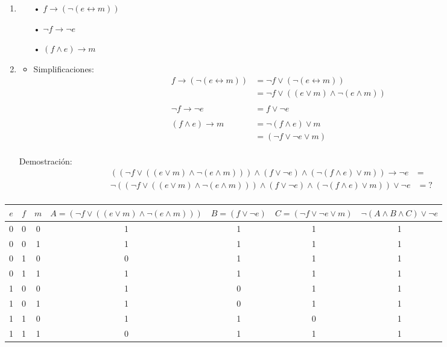 \documentclass[a4paper]{article}
\begin{document}
\begin{enumerate}[label=\alph*)]
\item 
\begin{itemize}
\item[•] $f \rightarrow (\neg (e \leftrightarrow m)) $
\item[•] $ \neg f \rightarrow \neg e$
\item[•] $ (f\wedge e) \rightarrow m$
\end{itemize}
\item \begin{itemize}
\item Simplificaciones:
\begin{align*}
f \rightarrow (\neg (e \leftrightarrow m)) &= \neg f \vee (\neg (e \leftrightarrow m))\\
&= \neg f \vee ((e \vee m)\wedge \neg (e\wedge m))\\
\\
\neg f \rightarrow \neg e &= f \vee \neg e \\
\\
(f\wedge e) \rightarrow m &= \neg (f\wedge e)  \vee m \\ &=(\neg f\vee \neg e\vee m)\\
\end{align*}
\end{itemize}
Demostración:
\begin{align*}
((\neg f \vee ((e \vee m)\wedge \neg (e\wedge m)))\wedge (f \vee \neg e)\wedge (\neg (f\wedge e)  \vee m))\rightarrow \neg e &=\\
\neg ((\neg f \vee ((e \vee m)\wedge \neg (e\wedge m)))\wedge (f \vee \neg e)\wedge (\neg (f\wedge e)  \vee m))\vee \neg e &=?\\
\end{align*}
\end{enumerate}
\begin{center}
\begin{tabular}{|c|c|c|c|c|c|c|}
\hline 
$e$ & $f$ & $m$ & $A=(\neg f \vee ((e \vee m)\wedge \neg (e \wedge m)))$ & $B=(f\vee \neg e)$ & $C=(\neg f\vee \neg e\vee m)$ & $\neg(A\wedge B\wedge C)\vee \neg e$ \\ 
\hline 
0 & 0 & 0 & 1 & 1 & 1 & 1 \\ 
\hline 
0 & 0 & 1 & 1 & 1 & 1 & 1 \\ 
\hline 
0 & 1 & 0 & 0 & 1 & 1 & 1 \\ 
\hline 
0 & 1 & 1 & 1 & 1 & 1 & 1 \\ 
\hline 
1 & 0 & 0 & 1 & 0 & 1 & 1 \\ 
\hline 
1 & 0 & 1 & 1 & 0 & 1 & 1 \\ 
\hline 
1 & 1 & 0 & 1 & 1 & 0 & 1 \\ 
\hline 
1 & 1 & 1 & 0 & 1 & 1 & 1 \\ 
\hline 
\end{tabular} 
\end{center}
\end{document}
